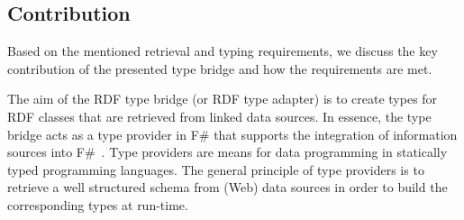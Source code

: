 \documentclass{llncs} %
\newcommand{\fs}{\textsf{F\#}\xspace}
\begin{document}





\subsection{Contribution}

Based on the mentioned retrieval and typing requirements,
we discuss the key contribution of the presented type bridge
and how the requirements are met.


The aim of the RDF type bridge (or RDF type adapter) is to create types for RDF classes that
are retrieved from linked data sources. 
In essence, the type bridge acts as a type provider in \fs that supports the integration of information sources
into \fs~\cite{Syme2012fsharp}. Type providers are means for data programming
in statically typed programming languages.
The general principle of type providers is 
to retrieve a well structured schema from (Web) data sources in order to build
the corresponding types at run-time.
\end{document}
